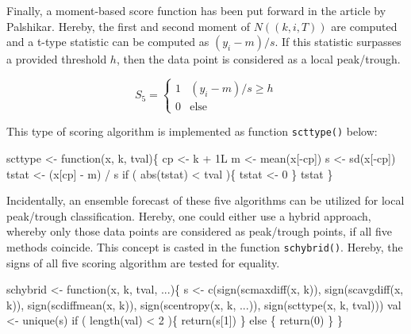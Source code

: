 \documentclass[a4paper]{article}
\begin{document}
Finally, a moment-based score function has been put forward in the
article by Palshikar. Hereby, the first and second moment of $N((k, i,
T))$ are computed and a t-type statistic can be computed as $(y_i - m)
/ s$. If this statistic surpasses a provided threshold $h$, then the
data point is considered as a local peak/trough.

\begin{equation}
\label{EQ5}
S_5 =
\begin{cases}
1 & (y_i - m) / s \ge h \\
0 & \text{else}
\end{cases}
\end{equation}

This type of scoring algorithm is implemented as function
\verb?scttype()? below:

\nwenddocs{}\endmoddef
scttype <- function(x, k, tval)\{
    cp <- k + 1L
    m <- mean(x[-cp])
    s <- sd(x[-cp])
    tstat <- (x[cp] - m) / s
    if ( abs(tstat) < tval )\{
        tstat <- 0
    \}
    tstat
\}
\eatline
{}\nwendcode{}%

Incidentally, an ensemble forecast of these five algorithms can be
utilized for local peak/trough classification. Hereby, one could
either use a hybrid approach, whereby only those data points are
considered as peak/trough points, if all five methods coincide. This
concept is casted in the function \verb?schybrid()?. Hereby, the signs of
all five scoring algorithm are tested for equality.

\nwenddocs{}\endmoddef
schybrid <- function(x, k, tval, ...)\{
    s <- c(sign(scmaxdiff(x, k)),
           sign(scavgdiff(x, k)),
           sign(scdiffmean(x, k)),
           sign(scentropy(x, k, ...)),
           sign(scttype(x, k, tval)))
    val <- unique(s)
    if ( length(val) < 2 )\{
        return(s[1])
    \} else \{
        return(0)
    \}
\}
\eatline
{}\nwendcode{}%
\end{document}
